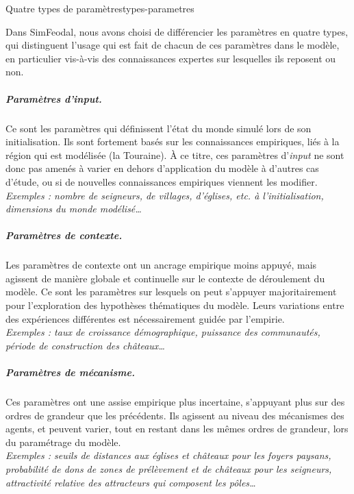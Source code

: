 \begin{encadre}{Quatre types de paramètres}{types-parametres}
\renewcommand{\thempfootnote}{\alph{mpfootnote}}

Dans SimFeodal, nous avons choisi de différencier les paramètres en quatre \og types\fg{}, qui distinguent l'usage	qui est fait de chacun de ces paramètres dans le modèle, en particulier vis-à-vis des connaissances expertes sur lesquelles ils reposent ou non.\vspace*{-1em}
	
\subparagraph*{Paramètres d'\textit{input}.}
	Ce sont les paramètres qui définissent l'état du monde simulé lors de son initialisation.
	Ils sont fortement basés sur les connaissances empiriques, liés à la région qui est modélisée (la Touraine).
	À ce titre, ces paramètres d'\textit{input} ne sont donc pas amenés à varier en dehors d'application du modèle à d'autres cas d'étude, ou si de nouvelles connaissances empiriques viennent les modifier.\\
	\textit{Exemples : nombre de seigneurs, de villages, d'églises, etc. à l'initialisation, dimensions du monde modélisé\ldots}\vspace*{-1em}

\subparagraph*{Paramètres de contexte.}
	Les paramètres de contexte ont un ancrage empirique moins appuyé, mais agissent de manière globale et continuelle sur le contexte de déroulement du modèle.
	Ce sont les paramètres sur lesquels on peut s'appuyer majoritairement pour l'exploration des hypothèses thématiques du modèle.
	Leurs variations entre des expériences différentes est nécessairement guidée par l'empirie.\\
	\textit{Exemples : taux de croissance démographique, puissance des communautés, période de construction des châteaux\ldots}\vspace*{-1em}	

\subparagraph*{Paramètres de mécanisme.}
	Ces paramètres ont une assise empirique plus incertaine, s'appuyant plus sur des ordres de grandeur que les précédents.
	Ils agissent au niveau des mécanismes des agents, et peuvent varier, tout en restant dans les mêmes ordres de grandeur, lors du paramétrage du modèle.\\
	\textit{Exemples : seuils de distances aux églises et châteaux pour les foyers paysans, probabilité de dons de zones de prélèvement et de châteaux pour les seigneurs, attractivité relative des attracteurs qui composent les pôles\ldots}\vspace*{-1em}


\end{encadre}
